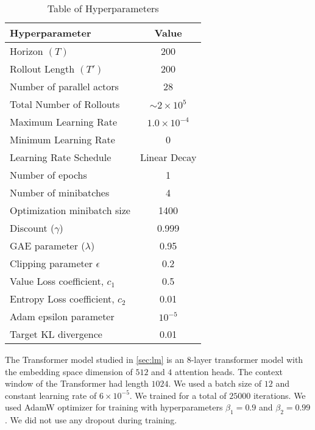 \begin{table}[ht]
    \centering
    \begin{tabular}{lc}
        \hline
        Hyperparameter & Value \\
        \hline
        Horizon $(T)$ & 200 \\
        Rollout Length $(T')$ & 200 \\ 
        Number of parallel actors & 28 \\
        Total Number of Rollouts & $\sim 2 \times 10^5$ \\
        Maximum Learning Rate & $1.0 \times 10^{-4}$ \\
        Minimum Learning Rate & 0 \\
        Learning Rate Schedule & Linear Decay \\
        Number of epochs & 1 \\
        Number of minibatches & 4 \\
        Optimization minibatch size & 1400 \\
        Discount ($\gamma$) & 0.999 \\
        GAE parameter ($\lambda$) & 0.95 \\
        Clipping parameter $\epsilon$ & 0.2 \\
        Value Loss coefficient, $c_1$ & 0.5 \\
        Entropy Loss coefficient, $c_2$ & 0.01 \\
        Adam epsilon parameter & $10^{-5}$ \\
        Target KL divergence & 0.01 \\
        \hline
    \end{tabular}
    \caption{Table of Hyperparameters}
    \label{tab:ppo_hyperparameters}
\end{table}

The Transformer model studied in \autoref{sec:lm} is an 8-layer transformer model with the embedding space dimension of $512$ and $4$ attention heads. The context window of the Transformer had length $1024$. We used a batch size of $12$ and constant learning rate of $6 \times 10^{-5}$. We trained for a total of $25000$ iterations. We used AdamW optimizer for training with hyperparameters $\beta_1 = 0.9$ and $\beta_2 = 0.99$. We did not use any dropout during training. 